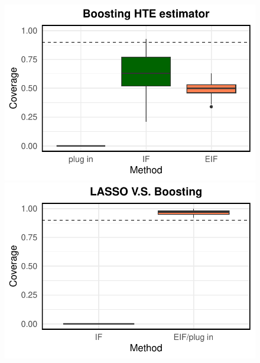 \documentclass{article}
\theoremstyle{plain}
\theoremstyle{definition}
\theoremstyle{plain}
\begin{document}
\begin{figure}[h]
\begin{minipage}{0.3\textwidth}
                \includegraphics[clip, trim = 0cm 0cm 0cm 0cm, width = \textwidth]{plot/simulation_linear_coverage_Boosting.pdf}
        \end{minipage}
        \begin{minipage}{0.3\textwidth}
                \centering
                \includegraphics[clip, trim = 0cm 0cm 0cm 0cm, width = \textwidth]{plot/simulation_linear_coverage_LASSO_V.S._Boosting.pdf}
        \end{minipage}        
        \\  
        \begin{minipage}{0.3\textwidth}
                \centering

\end{minipage}
\end{figure}
\end{document}
